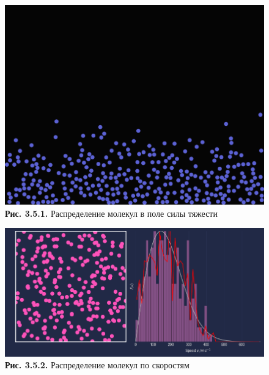   \begin{figure}[ht]
 \centering
		\includegraphics[height =11 cm, keepaspectratio]{images/gravity.png}
		\caption{ \textbf{Рис. 3.5.1.} Распределение молекул в поле силы тяжести}
	\end{figure}
 \begin{figure}[ht]
 \centering
		\includegraphics[height =8 cm, keepaspectratio]{images/maxwell_boltsman.png}
		\caption{ \textbf{Рис. 3.5.2.} Распределение молекул по скоростям}
		
	\end{figure}

